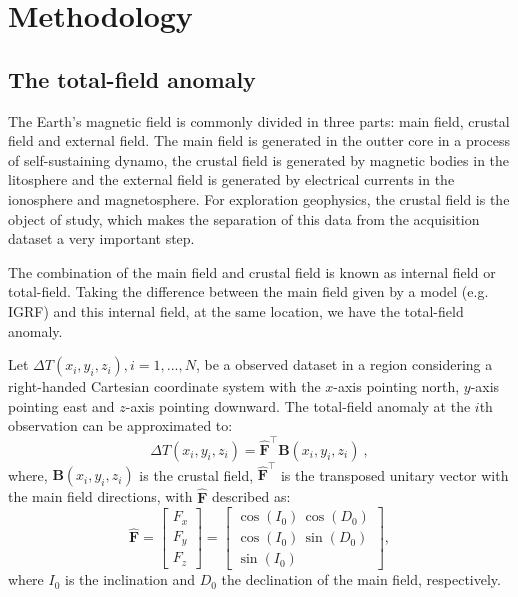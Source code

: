 \section{Methodology}

\subsection*{The total-field anomaly}

The Earth's magnetic field is commonly divided in three parts: main field, crustal field and external field. The main field is generated in the outter core in a process of self-sustaining dynamo, the crustal field is generated by magnetic bodies in the litosphere and the external field is generated by electrical currents in the ionosphere and magnetosphere. For exploration geophysics, the crustal field is the object of study, which makes the separation of this data from the acquisition dataset a very important step.

The combination of the main field and crustal field is known as internal field or total-field. Taking the difference between the main field given by a model (e.g. IGRF) and this internal field, at the same location, we have the total-field anomaly.

Let $\Delta T(x_i, y_i, z_i), i =  1,...,N$, be a observed dataset in a region considering a right-handed Cartesian coordinate system with the $x$-axis pointing north, $y$-axis pointing east and $z$-axis pointing downward. The total-field anomaly at the $i$th observation can be approximated to:
\begin{equation}
	\Delta T(x_i, y_i, z_i) = \hat{\mathbf{F}}^{\top} \mathbf{B}(x_i, y_i, z_i) \: ,
	\label{eq:tfanomaly}
\end{equation}
where, $\mathbf{B}(x_i, y_i, z_i)$ is the crustal field, $\hat{\mathbf{F}}^{\top}$ is the transposed unitary vector with the main field directions, with $\hat{\mathbf{F}}$ described as:
\begin{equation}
	\hat{\mathbf{F}} = \left[
	\begin{array}{c}
		F_x \\
		F_y \\
		F_z
	\end{array} \right] = 
	\left[
	\begin{array}{c}
		\cos(I_{0}) \, \cos(D_{0}) \\
		\cos(I_{0}) \, \sin(D_{0}) \\
		\sin(I_{0})
	\end{array} \right],
	\label{eq:unit_vector_F}
\end{equation}
where $I_{0}$ is the inclination and $D_{0}$ the declination of the main field, respectively.

